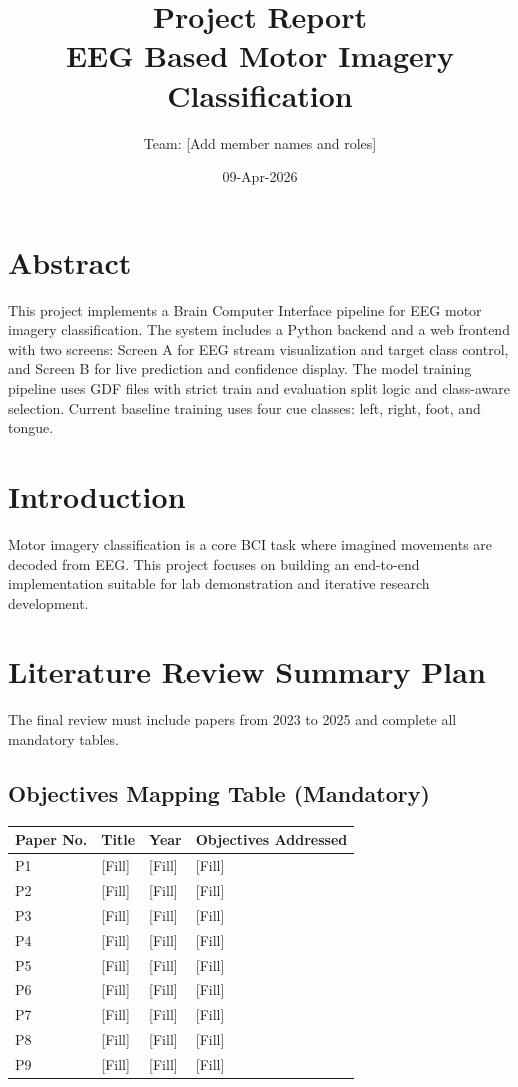 \documentclass[12pt,a4paper]{article}
\title{Project Report\\\large EEG Based Motor Imagery Classification}
\author{Team: [Add member names and roles]}
\date{09-Apr-2026}
\begin{document}
\maketitle

\section*{Abstract}
This project implements a Brain Computer Interface pipeline for EEG motor imagery classification. The system includes a Python backend and a web frontend with two screens: Screen A for EEG stream visualization and target class control, and Screen B for live prediction and confidence display. The model training pipeline uses GDF files with strict train and evaluation split logic and class-aware selection. Current baseline training uses four cue classes: left, right, foot, and tongue.

\section{Introduction}
Motor imagery classification is a core BCI task where imagined movements are decoded from EEG. This project focuses on building an end-to-end implementation suitable for lab demonstration and iterative research development.

\section{Literature Review Summary Plan}
The final review must include papers from 2023 to 2025 and complete all mandatory tables.

\subsection{Objectives Mapping Table (Mandatory)}
\begin{longtable}{p{}p{}p{}p{}}
\toprule
\textbf{Paper No.} & \textbf{Title} & \textbf{Year} & \textbf{Objectives Addressed} \\
\midrule
P1 & [Fill] & [Fill] & [Fill] \\
P2 & [Fill] & [Fill] & [Fill] \\
P3 & [Fill] & [Fill] & [Fill] \\
P4 & [Fill] & [Fill] & [Fill] \\
P5 & [Fill] & [Fill] & [Fill] \\
P6 & [Fill] & [Fill] & [Fill] \\
P7 & [Fill] & [Fill] & [Fill] \\
P8 & [Fill] & [Fill] & [Fill] \\
P9 & [Fill] & [Fill] & [Fill] \\
\bottomrule
\end{longtable}
\end{document}
